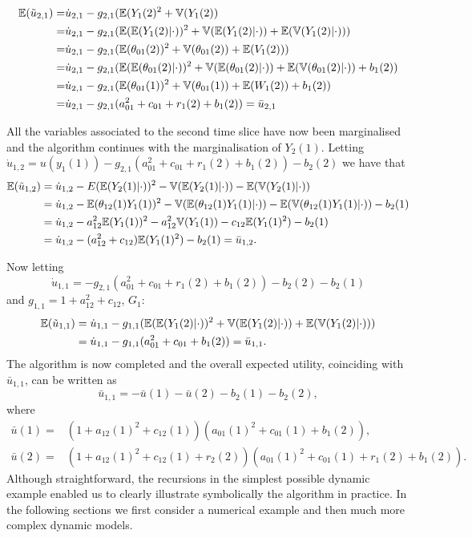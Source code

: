 \begin{align}
\mathbb{E}(\tilde{u}_{2,1})=&\dot{u}_{2,1}-g_{2,1}(\mathbb{E}(Y_1(2)^2+\mathbb{V}(Y_1(2))\nonumber\\
=&   \dot{u}_{2,1}-g_{2,1}(\mathbb{E}(\mathbb{E}(Y_1(2)|\cdot))^2+\mathbb{V}(\mathbb{E}(Y_1(2)|\cdot))+\mathbb{E}(\mathbb{V}(Y_1(2)|\cdot)))\nonumber\\
=&\dot{u}_{2,1}-g_{2,1}( \mathbb{E}(\theta_{01}(2))^2+\mathbb{V}(\theta_{01}(2))+\mathbb{E}(V_1(2)) )\nonumber\\
=&\dot{u}_{2,1}-g_{2,1}(\mathbb{E}(\mathbb{E}(\theta_{01}(2)|\cdot))^2+\mathbb{V}(\mathbb{E}(\theta_{01}(2)|\cdot))+\mathbb{E}(\mathbb{V}(\theta_{01}(2)|\cdot))+b_1(2) )\nonumber\\
=&\dot{u}_{2,1}-g_{2,1}( \mathbb{E}(\theta_{01}(1))^2+\mathbb{V}(\theta_{01}(1))+\mathbb{E}(W_1(2))+b_1(2)   ) \nonumber\\
=&\dot{u}_{2,1}-g_{2,1}(a_{01}^2+c_{01}+r_1(2)+b_1(2))=\bar{u}_{2,1}\nonumber
\end{align}

All the variables associated to the second time slice have now been marginalised and the algorithm continues with the marginalisation of $Y_2(1)$. Letting $\dot{u}_{1,2}=u(y_1(1))-g_{2,1}(a_{01}^2+c_{01}+r_1(2)+b_1(2))-b_2(2)$ we have that 
\begin{align}
\mathbb{E}(\tilde{u}_{1,2})&=\dot{u}_{1,2}-E(\mathbb{E}(Y_2(1)|\cdot))^2-\mathbb{V}(\mathbb{E}(Y_2(1)|\cdot))-\mathbb{E}(\mathbb{V}(Y_2(1)|\cdot))\nonumber\\
&=\dot{u}_{1,2}- \mathbb{E}(\theta_{12}(1)Y_1(1))^2-\mathbb{V}(\mathbb{E}(\theta_{12}(1)Y_1(1)|\cdot))-\mathbb{E}(\mathbb{V}(\theta_{12}(1)Y_1(1)|\cdot))-b_2(1)\nonumber\\
&=\dot{u}_{1,2}-a_{12}^2\mathbb{E}(Y_1(1))^2-a_{12}^2\mathbb{V}(Y_1(1))-c_{12}\mathbb{E}(Y_1(1)^2)-b_2(1)\nonumber\\
&=\dot{u}_{1,2}-(a_{12}^2+c_{12})\mathbb{E}(Y_1(1)^2)-b_{2}(1)=\bar{u}_{1,2}.\nonumber
\end{align}

Now letting 
\[
\dot{u}_{1,1}=-g_{2,1}(a_{01}^2+c_{01}+r_1(2)+b_1(2))-b_2(2)-b_2(1)
\]
and $g_{1,1}=1+a_{12}^2+c_{12}$, $G_1$:
\begin{align}
\mathbb{E}(\tilde{u}_{1,1})&=\dot{u}_{1,1}-g_{1,1}(\mathbb{E}(\mathbb{E}(Y_1(2)|\cdot))^2+\mathbb{V}(\mathbb{E}(Y_1(2)|\cdot))+\mathbb{E}(\mathbb{V}(Y_1(2)|\cdot)))\nonumber\\
&=\dot{u}_{1,1}-g_{1,1}(a_{01}^2+c_{01}+b_1(2))=\bar{u}_{1,1}.\nonumber
\end{align}
The algorithm is now completed and the overall expected utility, coinciding with $\bar{u}_{1,1}$, can be written as 
\begin{equation*}
\bar{u}_{1,1}=-\bar{u}(1)-\bar{u}(2)-b_2(1)-b_{2}(2),
\end{equation*}
     where 
     \begin{align*}
     \bar{u}(1)=&(1+a_{12}(1)^2+c_{12}(1))(a_{01}(1)^2+c_{01}(1)+b_1(2)),\\
     \bar{u}(2)=&(1+a_{12}(1)^2+c_{12}(1)+r_2(2))(a_{01}(1)^2+c_{01}(1)+r_1(2)+b_1(2)).
     \end{align*}
Although straightforward, the recursions in the simplest possible dynamic example enabled us to clearly illustrate symbolically the algorithm in practice. In the following sections we first consider a numerical example and then much more complex dynamic models.
\label{sec:wash}
